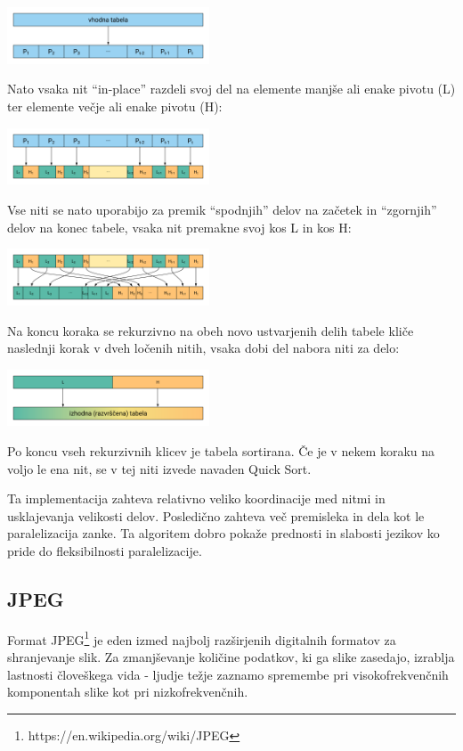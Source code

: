 \documentclass[journal,a4paper,twoside]{sty/IEEEtran}
\begin{document}
\includegraphics[width=0.45\textwidth]{aqs_diag_1}

Nato vsaka nit “in-place” razdeli svoj del na elemente manjše ali enake pivotu (L) ter elemente večje ali enake pivotu (H):

\includegraphics[width=0.45\textwidth]{aqs_diag_2}

Vse niti se nato uporabijo za premik “spodnjih” delov na začetek in “zgornjih” delov na konec tabele, vsaka nit premakne svoj kos L in kos H:

\includegraphics[width=0.45\textwidth]{aqs_diag_3}

Na koncu koraka se rekurzivno na obeh novo ustvarjenih delih tabele kliče naslednji korak v dveh ločenih nitih, vsaka dobi del nabora niti za delo:

\includegraphics[width=0.45\textwidth]{aqs_diag_4}

Po koncu vseh rekurzivnih klicev je tabela sortirana.
Če je v nekem koraku na voljo le ena nit, se v tej niti izvede navaden Quick Sort.

Ta implementacija zahteva relativno veliko koordinacije med nitmi in usklajevanja velikosti delov.
Posledično zahteva več premisleka in dela kot le paralelizacija zanke.
Ta algoritem dobro pokaže prednosti in slabosti jezikov ko pride do fleksibilnosti paralelizacije.

\subsection{JPEG}

Format JPEG\footnote{https://en.wikipedia.org/wiki/JPEG} je eden izmed najbolj razširjenih digitalnih formatov za shranjevanje slik.
Za zmanjševanje količine podatkov, ki ga slike zasedajo, izrablja lastnosti človeškega vida - ljudje težje zaznamo spremembe pri visokofrekvenčnih
	komponentah slike kot pri nizkofrekvenčnih.
\end{document}
